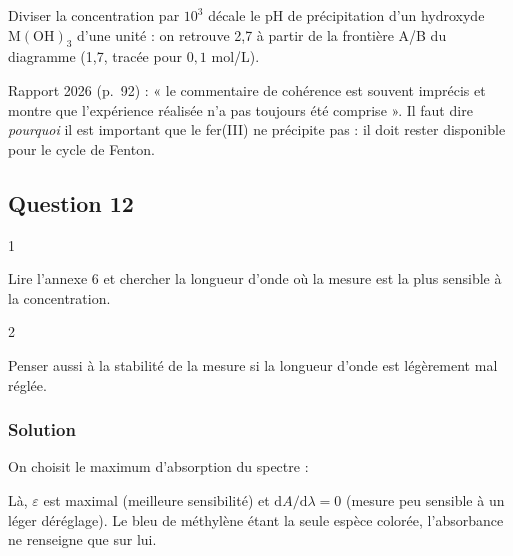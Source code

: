 \documentclass[11pt,a4paper]{article}
\newcommand{\equationajustee}[1]{%
  \sbox{\boiteequation}{$\displaystyle #1$}%
  \ifdim\wd\boiteequation>\linewidth
    \[\resizebox{\linewidth}{!}{\usebox{\boiteequation}}\]%
  \else
    \[#1\]%
  \fi}
\begin{document}
\begin{methode}

Diviser la concentration par \(10^3\) décale le pH de précipitation d'un hydroxyde \(\mathrm{M(OH)_3}\) d'une unité : on retrouve 2,7 à partir de la frontière A/B du diagramme (1,7, tracée pour \(0{,}1\) mol/L).

\end{methode}

\begin{jury}

Rapport 2026 (p.~92) : « le commentaire de cohérence est souvent imprécis et montre que l'expérience réalisée n'a pas toujours été comprise ». Il faut dire \emph{pourquoi} il est important que le fer(III) ne précipite pas : il doit rester disponible pour le cycle de Fenton.

\end{jury}

\hypertarget{question-12}{%
\subsection{Question 12}\label{question-12}}

\begin{indication}{1}

Lire l'annexe 6 et chercher la longueur d'onde où la mesure est la plus sensible à la concentration.

\end{indication}

\begin{indication}{2}

Penser aussi à la stabilité de la mesure si la longueur d'onde est légèrement mal réglée.

\end{indication}

\hypertarget{solution-11}{%
\subsubsection{Solution}\label{solution-11}}

On choisit le maximum d'absorption du spectre :

\equationajustee{\boxed{\lambda\approx665\ \mathrm{nm}}}

Là, \(\varepsilon\) est maximal (meilleure sensibilité) et \(\mathrm dA/\mathrm d\lambda=0\) (mesure peu sensible à un léger déréglage). Le bleu de méthylène étant la seule espèce colorée, l'absorbance ne renseigne que sur lui.
\end{document}
